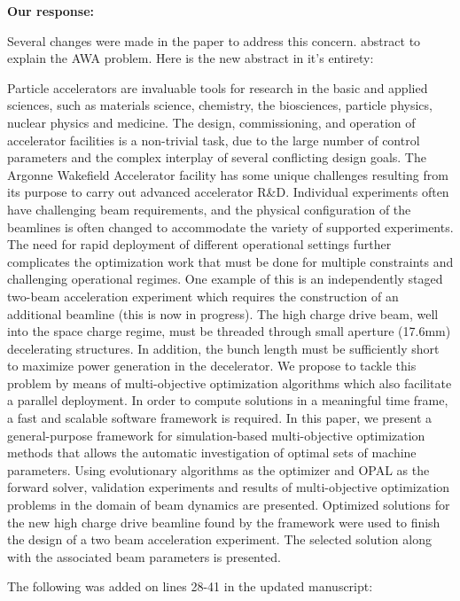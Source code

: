 \documentclass{article}
\begin{document}
{\bf Our response:} {\color{blue} 
	Several changes were made in the paper to address this concern. 
	 abstract to explain the AWA problem. 
	Here is the new abstract in it's entirety: 
	
	Particle accelerators are invaluable tools for research in the basic and applied sciences, such as materials science, chemistry,
	the biosciences, particle physics, nuclear physics and medicine. The design, commissioning, and operation of accelerator facilities is a
	non-trivial task, due to the large number of control parameters and the complex interplay of several conflicting design goals.
	The Argonne Wakefield Accelerator facility has some unique challenges resulting from its purpose to carry out advanced accelerator R\&D.
	Individual experiments often have challenging beam requirements, and the physical configuration of the beamlines is often changed
	to accommodate the variety of supported experiments. The need for rapid deployment of different operational settings
	further complicates the optimization work that must be done for multiple constraints and challenging operational regimes. 
	One example of this is an independently staged two-beam acceleration experiment which requires the construction 
	of an additional beamline (this is now in progress).  The high charge drive beam, well into the space charge regime, must be threaded
	through small aperture (17.6mm) decelerating structures.  
	In addition, the bunch length must be sufficiently short to maximize power generation in the decelerator.  
	We propose to tackle this problem by means of multi-objective optimization algorithms which also facilitate a parallel deployment.
	In order to compute solutions in a meaningful time frame, a fast and scalable software framework is required.
	In this paper, we present a general-purpose framework for simulation-based
	multi-objective optimization methods that allows the automatic investigation of optimal sets of machine parameters.
	Using evolutionary algorithms as the optimizer and \textsc{OPAL} as the forward solver, validation experiments and 
	results of multi-objective optimization problems in the domain of beam dynamics are presented. 
	Optimized solutions for the new high charge drive beamline found by the framework were used to finish the design 
	of a two beam acceleration experiment.
	The selected solution along with the associated beam parameters is presented.
	
	
	
	The following was added on lines 28-41 in the updated manuscript:

}
\end{document}
